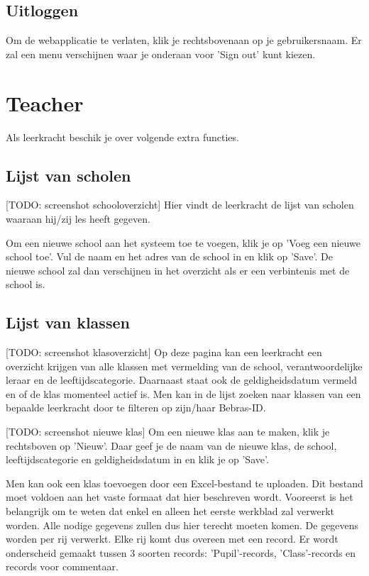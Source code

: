 \documentclass[]{article}
\begin{document}
\subsection{Uitloggen}
Om de webapplicatie te verlaten, klik je rechtsbovenaan op je gebruikersnaam. Er zal een menu verschijnen waar je onderaan voor 'Sign out' kunt kiezen.

\section{Teacher}

Als leerkracht beschik je over volgende extra functies.

\subsection{Lijst van scholen}

[TODO: screenshot schooloverzicht]
Hier vindt de leerkracht de lijst van scholen waaraan hij/zij les heeft gegeven.

Om een nieuwe school aan het systeem toe te voegen, klik je op 'Voeg een nieuwe school toe'. Vul de naam en het adres van de school in en klik op 'Save'. De nieuwe school zal dan verschijnen in het overzicht als er een verbintenis met de school is.

\subsection{Lijst van klassen}

[TODO: screenshot klasoverzicht]
Op deze pagina kan een leerkracht een overzicht krijgen van alle klassen met vermelding van de school, verantwoordelijke leraar en de leeftijdscategorie. Daarnaast staat ook de geldigheidsdatum vermeld en of de klas momenteel actief is.
Men kan in de lijst zoeken naar klassen van een bepaalde leerkracht door te filteren op zijn/haar Bebras-ID.

[TODO: screenshot nieuwe klas]
Om een nieuwe klas aan te maken, klik je rechtsboven op 'Nieuw'. Daar geef je de naam van de nieuwe klas, de school, leeftijdscategorie en geldigheidsdatum in en klik je op 'Save'.

Men kan ook een klas toevoegen door een Excel-bestand te uploaden. Dit bestand moet voldoen aan het vaste formaat dat hier beschreven wordt. 
Vooreerst is het belangrijk om te weten dat enkel en alleen het eerste werkblad zal verwerkt worden. Alle nodige gegevens zullen dus hier terecht moeten komen. De gegevens worden per rij verwerkt. Elke rij komt dus overeen met een record. Er wordt onderscheid gemaakt tussen 3 soorten records: 'Pupil'-records, 'Class'-records en records voor commentaar.
\end{document}

